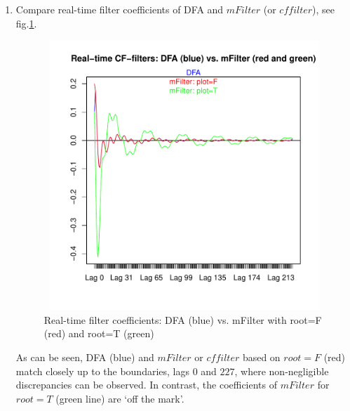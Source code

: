 \documentclass[a4paper]{book}
\begin{document}
\begin{enumerate}
\begin{Schunk}
\begin{Sinput}
> # Check first-order: should give 0
> print(paste("Transfer function in frequency zero: ",
+             round(sum(parm_mF_T[,1]),3),sep=""))
\end{Sinput}
\begin{Soutput}
[1] "Transfer function in frequency zero: -1.491"
\end{Soutput}
\end{Schunk}
Neither $mFilter$ nor $cffilter$  comply with the first-order constraint in frequency zero. Selecting $root=T$ results in a severly misspecified filter.
\item Compare real-time filter coefficients of DFA and $mFilter$ (or $cffilter$), see fig.\ref{z_CF_us_real_log_gdp}.
\begin{Schunk}
\end{Schunk}
\begin{figure}[H]\begin{center}\includegraphics[height=4in, width=6in]{z_CF_us_real_log_gdp}\caption{Real-time filter coefficients: DFA (blue) vs. mFilter with root=F (red) and root=T (green)\label{z_CF_us_real_log_gdp}}\end{center}\end{figure}As can be seen, DFA (blue) and $mFilter$ or $cffilter$ based on $root=F$ (red) match closely up to the boundaries, lags 0 and $227$, where non-negligible discrepancies can be observed. In contrast, the coefficients of $mFilter$ for $root=T$ (green line) are `off the mark'.

\end{enumerate}
\end{document}

